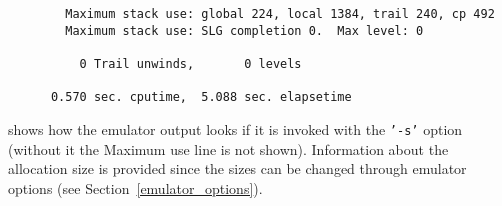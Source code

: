 \begin{description}
{\begin{verbatim}
        Maximum stack use: global 224, local 1384, trail 240, cp 492
        Maximum stack use: SLG completion 0.  Max level: 0

          0 Trail unwinds,       0 levels

      0.570 sec. cputime,  5.088 sec. elapsetime
     \end{verbatim}}
    shows how the emulator output looks if it is invoked with the 
    {\tt '-s'} option (without it the Maximum use line is not shown).
    Information about the allocation size is provided since the sizes
    can be changed through emulator options
    (see Section~\ref{emulator_options}).





\end{description}
